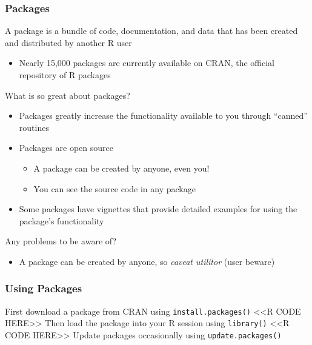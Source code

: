 \documentclass{beamer}
\begin{document}
\begin{frame}\frametitle{Packages}
    A package is a bundle of code, documentation, and data that has been created and distributed by another R user
    \begin{itemize}
        \item Nearly 15,000 packages are currently available on CRAN, the official repository of R packages 
    \end{itemize}
    \vspace{2ex}
    What is so great about packages?
    \begin{itemize}
        \item Packages greatly increase the functionality available to you through ``canned'' routines
        \item Packages are open source
        \begin{itemize}
            \item A package can be created by anyone, even you!
            \item You can see the source code in any package
        \end{itemize}
        \item Some packages have vignettes that provide detailed examples for using the package's functionality
    \end{itemize}
    \vspace{2ex}
    Any problems to be aware of?
    \begin{itemize}
        \item A package can be created by anyone, so \emph{caveat utilitor} (user beware)
    \end{itemize}
\end{frame}

\begin{frame}[fragile]\frametitle{Using Packages}
    First download a package from CRAN using \texttt{install.packages()}
    <<R CODE HERE>>
    \vspace{3ex}
    Then load the package into your R session using \texttt{library()}
    <<R CODE HERE>>
    \vspace{3ex}
    Update packages occasionally using \texttt{update.packages()}
\end{frame}
\end{document}
